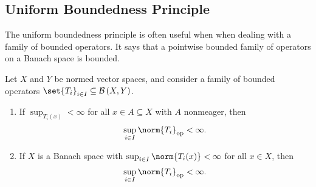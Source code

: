 \documentclass[10pt]{mypackage}
\begin{document}
  \subsection{Uniform Boundedness Principle}%
  The uniform boundedness principle is often useful when when dealing with a family of bounded operators. It says that a pointwise bounded family of operators on a Banach space is bounded.
  \begin{theorem}
    Let $X$ and $Y$ be normed vector spaces, and consider a family of bounded operators $\set{T_i}_{i\in I}\subseteq \mathcal{B}\left(X,Y\right)$.
    \begin{enumerate}[(1)]
      \item If $\sup_{T_i(x)} < \infty$ for all $x\in A\subseteq X$ with $A$ nonmeager, then
        \begin{align*}
          \sup_{i\in I}\norm{T_i}_{\text{op}} < \infty.
        \end{align*}
      \item If $X$ is a Banach space with $\sup_{i\in I}\norm{T_i(x)} < \infty$ for all $x\in X$, then
        \begin{align*}
          \sup_{i\in I}\norm{T_i}_{\text{op}} < \infty.
        \end{align*}
    \end{enumerate}
  \end{theorem}
\end{document}
